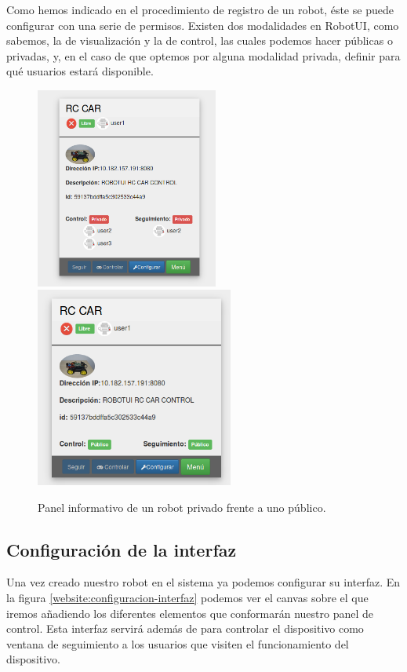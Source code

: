Como hemos indicado en el procedimiento de registro de un robot, éste se puede configurar  con una serie de permisos. Existen dos modalidades en RobotUI, como sabemos, la de visualización y la de control,
las cuales podemos hacer públicas o privadas, y, en el caso de que optemos por alguna modalidad privada, definir para qué usuarios estará disponible.





\begin{figure}[H]
    \centering
    \includegraphics[width=6cm]{imagenes/manual-usuario/robot-privado.png}
    \qquad
    \includegraphics[width=6.5cm]{imagenes/manual-usuario/robot-publico.png}
    \caption{Panel informativo de un robot privado frente a uno público.}%
    \label{fig:http-request}%
\end{figure}



\subsection{Configuración de la interfaz}

Una vez creado nuestro robot en el sistema ya podemos configurar su interfaz. En la figura \ref{website:configuracion-interfaz} podemos ver el canvas sobre el que iremos añadiendo los diferentes elementos que 
conformarán nuestro panel de control. Esta interfaz servirá además de para controlar el dispositivo como ventana de seguimiento a los usuarios que visiten el funcionamiento del dispositivo.

